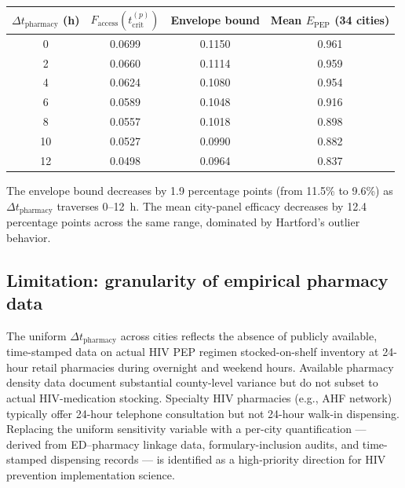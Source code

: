 \documentclass[11pt]{article}
\theoremstyle{definition}
\theoremstyle{remark}
\newcommand{\Epep}{E_{\text{PEP}}}
\newcommand{\Faccess}{F_{\text{access}}}
\newcommand{\tcrit}{t_{\text{crit}}}
\begin{document}
\begin{center}
\begin{tabular}{cccc}
\hline
$\Delta t_{\text{pharmacy}}$ (h) & $\Faccess(\tcrit^{(p)})$ & Envelope bound & Mean $\Epep$ (34 cities) \\
\hline
0  & 0.0699 & 0.1150 & 0.961 \\
2  & 0.0660 & 0.1114 & 0.959 \\
4  & 0.0624 & 0.1080 & 0.954 \\
6  & 0.0589 & 0.1048 & 0.916 \\
8  & 0.0557 & 0.1018 & 0.898 \\
10 & 0.0527 & 0.0990 & 0.882 \\
12 & 0.0498 & 0.0964 & 0.837 \\
\hline
\end{tabular}
\end{center}

The envelope bound decreases by 1.9 percentage points (from 11.5\% to 9.6\%) as $\Delta t_{\text{pharmacy}}$ traverses 0--12~h. The mean city-panel efficacy decreases by 12.4 percentage points across the same range, dominated by Hartford's outlier behavior.

\subsection{Limitation: granularity of empirical pharmacy data}

The uniform $\Delta t_{\text{pharmacy}}$ across cities reflects the absence of publicly available, time-stamped data on actual HIV PEP regimen stocked-on-shelf inventory at 24-hour retail pharmacies during overnight and weekend hours. Available pharmacy density data document substantial county-level variance but do not subset to actual HIV-medication stocking. Specialty HIV pharmacies (e.g., AHF network) typically offer 24-hour telephone consultation but not 24-hour walk-in dispensing. Replacing the uniform sensitivity variable with a per-city quantification --- derived from ED--pharmacy linkage data, formulary-inclusion audits, and time-stamped dispensing records --- is identified as a high-priority direction for HIV prevention implementation science.

\renewcommand{\refname}{\large\textbf{Supplementary References}}
\end{document}
